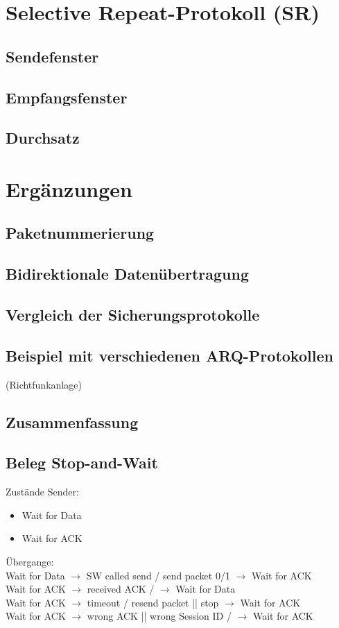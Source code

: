 \section{Selective Repeat-Protokoll (SR)}
\subsection{Sendefenster}
\subsection{Empfangsfenster}
\subsection{Durchsatz}

\section{Ergänzungen}
\subsection{Paketnummerierung}
\subsection{Bidirektionale Datenübertragung}
\subsection{Vergleich der Sicherungsprotokolle}
\subsection{Beispiel mit verschiedenen ARQ-Protokollen}
(Richtfunkanlage)
\subsection{Zusammenfassung}
\subsection{Beleg Stop-and-Wait}
Zustände Sender:
\begin{itemize}
\item Wait for Data
\item Wait for ACK
\end{itemize}
Übergange:\\
Wait for Data $\to$ SW called send / send packet 0/1 $\to$ Wait for ACK\\
Wait for ACK $\to$ received ACK /  $\to$ Wait for Data\\
Wait for ACK $\to$ timeout / resend packet || stop $\to$ Wait for ACK \\
Wait for ACK $\to$ wrong ACK || wrong Session ID / $\to$ Wait for ACK